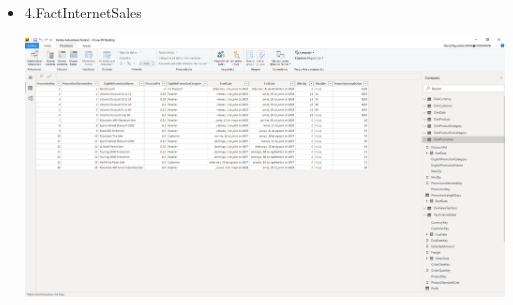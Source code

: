 \begin{itemize}
 \item 4.FactInternetSales

	\begin{center}
	\includegraphics[width=18cm]{./Imagenes/Imagen6}
	\end{center}	





\end{itemize}


